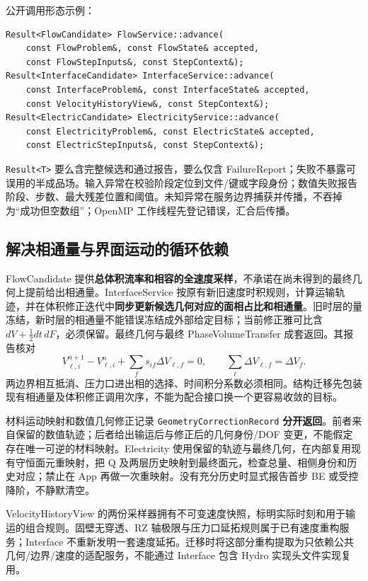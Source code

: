 \documentclass[UTF8,a4paper,11pt,fontset=fandol]{ctexart}
\numberwithin{equation}{section}
\newcommand{\code}[1]{\nolinkurl{#1}}
\begin{document}
公开调用形态示例：
{\footnotesize\begin{verbatim}
Result<FlowCandidate> FlowService::advance(
    const FlowProblem&, const FlowState& accepted,
    const FlowStepInputs&, const StepContext&);
Result<InterfaceCandidate> InterfaceService::advance(
    const InterfaceProblem&, const InterfaceState& accepted,
    const VelocityHistoryView&, const StepContext&);
Result<ElectricCandidate> ElectricityService::advance(
    const ElectricityProblem&, const ElectricState& accepted,
    const ElectricStepInputs&, const StepContext&);
\end{verbatim}}
\code{Result<T>} 要么含完整候选和通过报告，要么仅含 FailureReport；失败不暴露可误用的半成品场。输入异常在校验阶段定位到文件/键或字段身份；数值失败报告阶段、步数、最大残差位置和阈值。未知异常在服务边界捕获并传播，不吞掉为“成功但空数组”；OpenMP 工作线程先登记错误，汇合后传播。

\subsection{解决相通量与界面运动的循环依赖}
FlowCandidate 提供\textbf{总体积流率和相容的全速度采样}，不承诺在尚未得到的最终几何上提前给出相通量。InterfaceService 按原有新旧速度时积规则，计算运输轨迹，并在体积修正迭代中\textbf{同步更新候选几何对应的面相占比和相通量}。旧时层的量冻结，新时层的相通量不能错误冻结成外部给定目标；当前修正雅可比含 $dV+\tfrac12dt\,dF$，必须保留。最终几何与最终 PhaseVolumeTransfer 成套返回。其报告核对
\[
 V_{\ell,i}^{n+1}-V_{\ell,i}^{n}
       +\sum_f s_{if}\Delta V_{\ell,f}=0,\qquad
 \sum_\ell\Delta V_{\ell,f}=\Delta V_f .
\]
两边界相互抵消、压力口进出相的选择、时间积分系数必须相同。结构迁移先包装现有相通量及体积修正调用次序，不能为配合接口换一个更容易收敛的目标。

材料运动映射和数值几何修正记录 \code{GeometryCorrectionRecord} \textbf{分开返回}。前者来自保留的数值轨迹；后者给出输运后与修正后的几何身份/DOF 变更，不能假定存在唯一可逆的材料映射。Electricity 使用保留的轨迹与最终几何，在内部复用现有守恒面元重映射，把 Q 及两层历史映射到最终面元，检查总量、相侧身份和历史对应；禁止在 App 再做一次重映射。没有充分历史时显式报告首步 BE 或受控降阶，不静默清空。

VelocityHistoryView 的两份采样器拥有不可变速度快照，标明实际时刻和用于输运的组合规则。固壁无穿透、RZ 轴极限与压力口延拓规则属于已有速度重构服务；Interface 不重新发明一套速度延拓。迁移时将这部分重构提取为只依赖公共几何/边界/速度的适配服务，不能通过 Interface 包含 Hydro 实现头文件实现复用。
\end{document}
